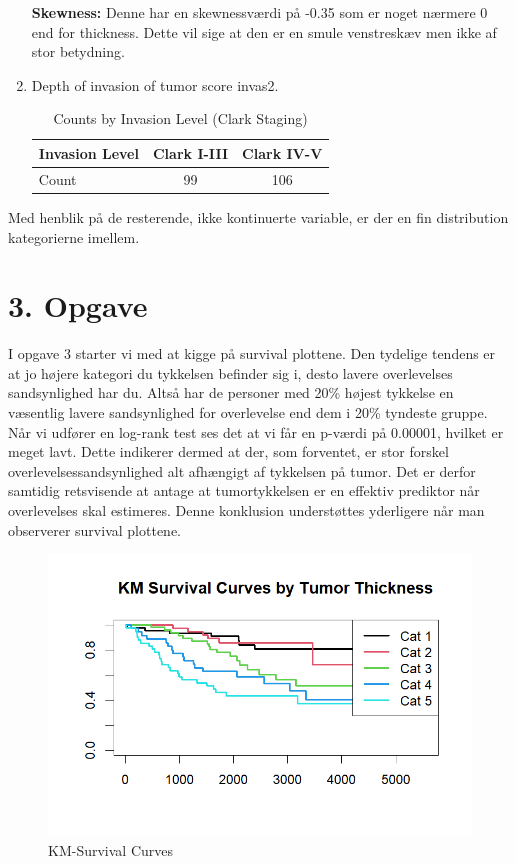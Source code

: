 \begin{enumerate}
\textbf{Skewness:} Denne har en skewnessværdi på -0.35 som er noget nærmere 0 end for thickness. Dette vil sige at den er en smule venstreskæv men ikke af stor betydning.
\item Depth of invasion of tumor score invas2.
\begin{table}[h!]
    \centering
    \begin{tabular}{|l|c|c|}
        \hline
        Invasion Level & Clark I-III & Clark IV-V \\
        \hline
        Count & 99 & 106 \\
        \hline
    \end{tabular}
    \caption{Counts by Invasion Level (Clark Staging)}
    \label{tab:invasion_level}
\end{table}

\end{enumerate}

Med henblik på de resterende, ikke kontinuerte variable, er der en fin distribution kategorierne imellem.



\chapter{3. Opgave}
I opgave 3 starter vi med at kigge på survival plottene. Den tydelige tendens er at jo højere kategori du tykkelsen befinder sig i, desto lavere overlevelses sandsynlighed har du. Altså har de personer med 20\% højest tykkelse en væsentlig lavere sandsynlighed for overlevelse end dem i 20\% tyndeste gruppe.\\
Når vi udfører en log-rank test ses det at vi får en p-værdi på 0.00001, hvilket er meget lavt. Dette indikerer dermed at der, som forventet, er stor forskel overlevelsessandsynlighed alt afhængigt af tykkelsen på tumor. Det er derfor samtidig retsvisende at antage at tumortykkelsen er en effektiv prediktor når overlevelses skal estimeres. Denne konklusion understøttes yderligere når man observerer survival plottene.
\begin{figure}[H]
    \centering
    \includegraphics[width=1\linewidth]{Formalities/Billeder/surv_curves_project.png}
    \caption{KM-Survival Curves}
    \label{surv_curv}
\end{figure}


